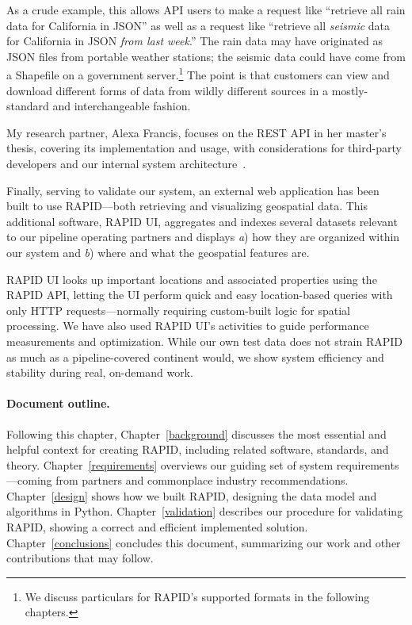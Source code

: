 As a crude example, this allows API users to make a request like ``retrieve all rain data for California in JSON'' as well as a request like ``retrieve all \textit{seismic} data for California in JSON \textit{from last week}.'' The rain data may have originated as JSON files from portable weather stations; the seismic data could have come from a Shapefile on a government server.\footnote{We discuss particulars for RAPID's supported formats in the following chapters.} The point is that customers can view and download different forms of data from wildly different sources in a mostly-standard and interchangeable fashion.

My research partner, Alexa Francis, focuses on the REST API in her master's thesis, covering its implementation and usage, with considerations for third-party developers and our internal system architecture~\cite{Francis}.

\label{polyview_intro}
Finally, serving to validate our system, an external web application has been built to use RAPID---both retrieving and visualizing geospatial data. This additional software, RAPID UI, aggregates and indexes several datasets relevant to our pipeline operating partners and displays \textit{a}) how they are organized within our system and \textit{b}) where and what the geospatial features are.

RAPID UI looks up important locations and associated properties using the RAPID API, letting the UI perform quick and easy location-based queries with only HTTP requests---normally requiring custom-built logic for spatial processing. We have also used RAPID UI's activities to guide performance measurements and optimization. While our own test data does not strain RAPID as much as a pipeline-covered continent would, we show system efficiency and stability during real, on-demand work.

\paragraph{Document outline.}
Following this chapter, Chapter~\ref{background} discusses the most essential and helpful context for creating RAPID, including related software, standards, and theory. Chapter~\ref{requirements} overviews our guiding set of system requirements---coming from partners and commonplace industry recommendations. Chapter~\ref{design} shows how we built RAPID, designing the data model and algorithms in Python. Chapter~\ref{validation} describes our procedure for validating RAPID, showing a correct and efficient implemented solution. Chapter~\ref{conclusions} concludes this document, summarizing our work and other contributions that may follow.


